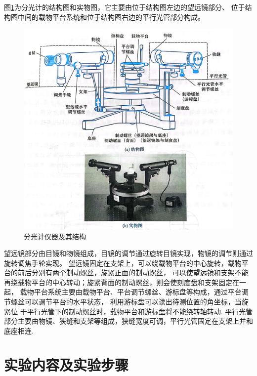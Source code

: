 \documentclass{ctexart}
\begin{document}
图\ref{yiqijiegou}为分光计的结构图和实物图，它主要由位于结构图左边的望远镜部分、
位于结构图中间的载物平台系统和位于结构图右边的平行光管部分构成。
\begin{figure}[H]
  \centering
  \includegraphics[height=1.2\textwidth,width=1\textwidth]{yiqijiegou.jpg}
  \caption{分光计仪器及其结构}\label{yiqijiegou}
\end{figure}

望远镜部分由目镜和物镜组成，目镜的调节通过旋转目镜实现，物镜的调节则通过旋转调焦手轮实现。
望远镜固定在支架上，可以绕载物平台的中心旋转，载物平台的前后分别有两个制动螺丝，旋紧正面的制动螺丝，
可以使望远镜和支架不能再绕载物平台的中心转动；旋紧背面的制动螺丝，则会使刻度盘和支架固定在一起，
载物平台系统主要由载物平台、平台调节螺丝、游标盘等构成，通过平台调节螺丝可以调节平台的水平状态，
利用游标盘可以读出待测位置的角坐标，当旋紧位
于平行光管下的制动螺丝时，载物平台和游标盘将不能绕转轴转动.
平行光管部分主要由物镜、狭缝和支架等组成，狭缝宽度可调，平行光管固定在支架上并和底座相连.

\section{实验内容及实验步骤}
\end{document}
